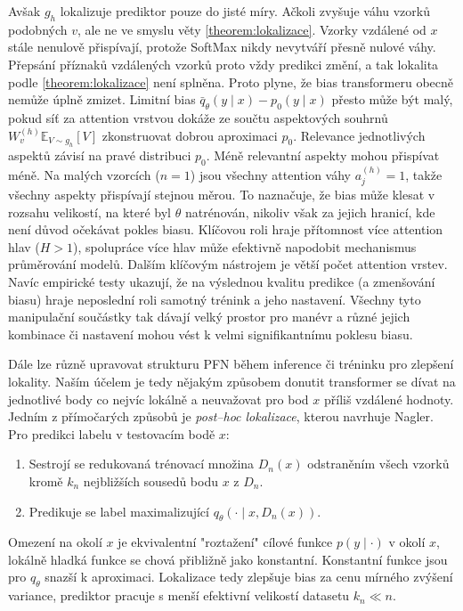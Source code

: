 Avšak $g_h$ lokalizuje prediktor pouze do jisté míry.
Ačkoli zvyšuje váhu vzorků podobných $v$, ale ne ve smyslu věty \ref{theorem:lokalizace}.
Vzorky vzdálené od $x$ stále nenulově přispívají, protože SoftMax nikdy nevytváří přesně nulové váhy. 
Přepsání příznaků vzdálených vzorků proto vždy predikci změní, a tak lokalita podle \ref{theorem:lokalizace} není splněna. 
Proto plyne, že bias transformeru obecně nemůže úplně zmizet.
Limitní bias $\bar{q}_\theta(y \mid x) - p_0(y \mid x)$ přesto může být malý, pokud síť za attention vrstvou dokáže ze součtu aspektových souhrnů $W^{(h)}_v \mathbb{E}_{V \sim g_h}[V]$ zkonstruovat dobrou aproximaci $p_0$. 
Relevance jednotlivých aspektů závisí na pravé distribuci $p_0$.
Méně relevantní aspekty mohou přispívat méně. 
Na malých vzorcích ($n = 1$) jsou všechny attention váhy $a^{(h)}_j = 1$, takže všechny aspekty přispívají stejnou měrou. 
To naznačuje, že bias může klesat v rozsahu velikostí, na které byl $\theta$ natrénován, nikoliv však za jejich hranicí, kde není důvod očekávat pokles biasu.
Klíčovou roli hraje přítomnost více attention hlav ($H > 1$), spolupráce více hlav může efektivně napodobit mechanismus průměrování modelů.
Dalším klíčovým nástrojem je větší počet attention vrstev.
Navíc empirické testy ukazují, že na výslednou kvalitu predikce (a zmenšování biasu) hraje neposlední roli samotný trénink a jeho nastavení.
Všechny tyto manipulační součástky tak dávají velký prostor pro manévr a různé jejich kombinace či nastavení mohou vést k velmi signifikantnímu poklesu biasu.
\par

Dále lze různě upravovat strukturu PFN během inference či tréninku pro zlepšení lokality.
Naším účelem je tedy nějakým způsobem donutit transformer se dívat na jednotlivé body co nejvíc lokálně a neuvažovat pro bod $x$ příliš vzdálené hodnoty.
Jedním z přímočarých způsobů je \textit{post–hoc lokalizace}, kterou navrhuje Nagler.
Pro predikci labelu v testovacím bodě $x$:
\begin{enumerate}
    \item Sestrojí se redukovaná trénovací množina $D_n(x)$ odstraněním všech vzorků kromě $k_n$ nejbližších sousedů bodu $x$ z $D_n$.
    \item Predikuje se label maximalizující $q_\theta(\cdot \mid x, D_n(x))$.
\end{enumerate}

Omezení na okolí $x$ je ekvivalentní "roztažení" cílové funkce $p(y \mid \cdot)$ v okolí $x$, lokálně hladká funkce se chová přibližně jako konstantní. 
Konstantní funkce jsou pro $q_\theta$ snazší k aproximaci. 
Lokalizace tedy zlepšuje bias za cenu mírného zvýšení variance, prediktor pracuje s menší efektivní velikostí datasetu $k_n \ll n$.
